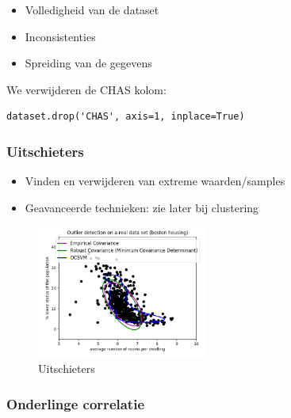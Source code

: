 \documentclass{article}
\begin{document}
\begin{itemize}
    \item Volledigheid van de dataset
    \item Inconsistenties
    \item Spreiding van de gegevens
\end{itemize}

We verwijderen de CHAS kolom:

\begin{verbatim}
dataset.drop('CHAS', axis=1, inplace=True)
\end{verbatim}


\subsubsection{Uitschieters}

\begin{itemize}
    \item Vinden en verwijderen van extreme waarden/samples
    \item Geavanceerde technieken: zie later bij clustering
\end{itemize}

\begin{figure}[H]
    \centering
    \includegraphics[width=0.5\textwidth]{multiple-regression-uitschieters.png}
    \caption{Uitschieters}
\end{figure}


\subsubsection{Onderlinge correlatie}
\end{document}
